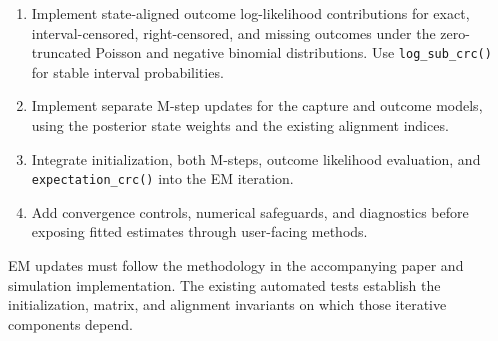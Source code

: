\documentclass[11pt,letterpaper]{article}
\begin{document}
\begin{enumerate}
  \item Implement state-aligned outcome log-likelihood contributions for exact,
  interval-censored, right-censored, and missing outcomes under the
  zero-truncated Poisson and negative binomial distributions. Use
  \texttt{log\_sub\_crc()} for stable interval probabilities.

  \item Implement separate M-step updates for the capture and outcome models,
  using the posterior state weights and the existing alignment indices.

  \item Integrate initialization, both M-steps, outcome likelihood evaluation,
  and \texttt{expectation\_crc()} into the EM iteration.

  \item Add convergence controls, numerical safeguards, and diagnostics
  before exposing fitted estimates through user-facing methods.
\end{enumerate}

EM updates must follow the methodology in the accompanying paper and simulation
implementation. The existing automated tests establish the initialization,
matrix, and alignment invariants on which those iterative components depend.
\end{document}
